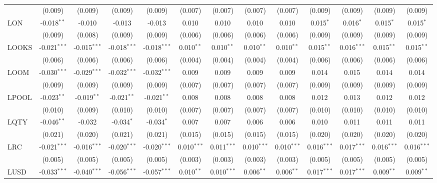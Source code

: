 \begin{table}[!htbp]
\begin{tabular}{@{\extracolsep{5pt}}lcccccccccccc}
  & (0.009) & (0.009) & (0.009) & (0.009) & (0.007) & (0.007) & (0.007) & (0.007) & (0.009) & (0.009) & (0.009) & (0.009) \\
 LON & -0.018$^{**}$ & -0.010$^{}$ & -0.013$^{}$ & -0.013$^{}$ & 0.010$^{}$ & 0.010$^{}$ & 0.010$^{}$ & 0.010$^{}$ & 0.015$^{*}$ & 0.016$^{*}$ & 0.015$^{*}$ & 0.015$^{*}$ \\
  & (0.009) & (0.008) & (0.009) & (0.009) & (0.006) & (0.006) & (0.006) & (0.006) & (0.009) & (0.009) & (0.009) & (0.009) \\
 LOOKS & -0.021$^{***}$ & -0.015$^{***}$ & -0.018$^{***}$ & -0.018$^{***}$ & 0.010$^{**}$ & 0.010$^{**}$ & 0.010$^{**}$ & 0.010$^{**}$ & 0.015$^{**}$ & 0.016$^{***}$ & 0.015$^{**}$ & 0.015$^{**}$ \\
  & (0.006) & (0.006) & (0.006) & (0.006) & (0.004) & (0.004) & (0.004) & (0.004) & (0.006) & (0.006) & (0.006) & (0.006) \\
 LOOM & -0.030$^{***}$ & -0.029$^{***}$ & -0.032$^{***}$ & -0.032$^{***}$ & 0.009$^{}$ & 0.009$^{}$ & 0.009$^{}$ & 0.009$^{}$ & 0.014$^{}$ & 0.015$^{}$ & 0.014$^{}$ & 0.014$^{}$ \\
  & (0.009) & (0.009) & (0.009) & (0.009) & (0.007) & (0.007) & (0.007) & (0.007) & (0.009) & (0.009) & (0.009) & (0.009) \\
 LPOOL & -0.023$^{**}$ & -0.019$^{**}$ & -0.021$^{**}$ & -0.021$^{**}$ & 0.008$^{}$ & 0.008$^{}$ & 0.008$^{}$ & 0.008$^{}$ & 0.012$^{}$ & 0.013$^{}$ & 0.012$^{}$ & 0.012$^{}$ \\
  & (0.010) & (0.009) & (0.010) & (0.010) & (0.007) & (0.007) & (0.007) & (0.007) & (0.010) & (0.010) & (0.010) & (0.010) \\
 LQTY & -0.046$^{**}$ & -0.032$^{}$ & -0.034$^{*}$ & -0.034$^{*}$ & 0.007$^{}$ & 0.007$^{}$ & 0.006$^{}$ & 0.006$^{}$ & 0.010$^{}$ & 0.011$^{}$ & 0.011$^{}$ & 0.011$^{}$ \\
  & (0.021) & (0.020) & (0.021) & (0.021) & (0.015) & (0.015) & (0.015) & (0.015) & (0.020) & (0.020) & (0.020) & (0.020) \\
 LRC & -0.021$^{***}$ & -0.016$^{***}$ & -0.020$^{***}$ & -0.020$^{***}$ & 0.010$^{***}$ & 0.011$^{***}$ & 0.010$^{***}$ & 0.010$^{***}$ & 0.016$^{***}$ & 0.017$^{***}$ & 0.016$^{***}$ & 0.016$^{***}$ \\
  & (0.005) & (0.005) & (0.005) & (0.005) & (0.003) & (0.003) & (0.003) & (0.003) & (0.005) & (0.005) & (0.005) & (0.005) \\
 LUSD & -0.033$^{***}$ & -0.040$^{***}$ & -0.056$^{***}$ & -0.057$^{***}$ & 0.010$^{**}$ & 0.010$^{***}$ & 0.006$^{**}$ & 0.006$^{**}$ & 0.017$^{***}$ & 0.017$^{***}$ & 0.009$^{**}$ & 0.009$^{**}$ \\

\end{tabular}
\end{table}
